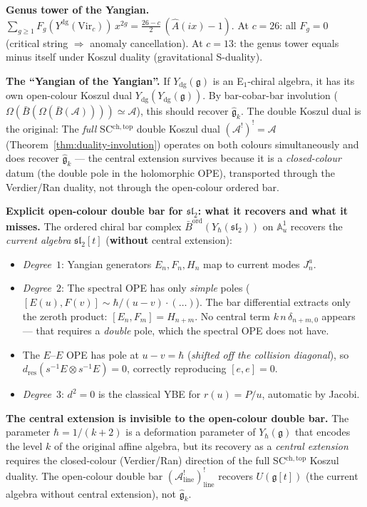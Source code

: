 \documentclass[11pt]{article}
\newcommand{\cA}{\mathcal{A}}
\newcommand{\fg}{\mathfrak{g}}
\begin{document}
\medskip\noindent\textbf{Genus tower of the Yangian.}\enspace
$\sum_{g \ge 1} F_g(Y^{\mathrm{dg}}(\mathrm{Vir}_c))\,x^{2g}
= \frac{26-c}{2}\,(\hat{A}(ix) - 1)$.
At $c = 26$: all $F_g = 0$ (critical string $\Rightarrow$
anomaly cancellation).  At $c = 13$: the genus tower equals
minus itself under Koszul duality (gravitational S-duality).

\medskip\noindent\textbf{The ``Yangian of the Yangian''.}\enspace
If $Y_{\mathrm{dg}}(\fg)$ is an E$_1$-chiral algebra, it has its
own open-colour Koszul dual
$Y_{\mathrm{dg}}(Y_{\mathrm{dg}}(\fg))$.  By bar-cobar-bar
involution
($\Omega(\bar{B}(\Omega(\bar{B}(\cA)))) \simeq \cA$),
this should recover $\widehat{\fg}_k$.  The double Koszul
dual is the original:
The \emph{full} SC${}^{\mathrm{ch,top}}$ double Koszul dual
$(\cA^!)^! = \cA$ (Theorem~\ref{thm:duality-involution})
operates on both colours simultaneously and does recover
$\widehat{\fg}_k$ --- the central extension survives because
it is a \emph{closed-colour} datum (the double pole in
the holomorphic OPE), transported through the Verdier/Ran
duality, not through the open-colour ordered bar.

\medskip\noindent\textbf{Explicit open-colour double bar for
$\mathfrak{sl}_2$: what it recovers and what it misses.}\enspace
The ordered chiral bar complex
$\bar{B}^{\mathrm{ord}}(Y_\hbar(\mathfrak{sl}_2))$ on
$\mathbb{A}^1_u$ recovers the \emph{current algebra}
$\mathfrak{sl}_2[t]$ (\textbf{without} central extension):
\begin{itemize}[nosep]
\item \emph{Degree~$1$}: Yangian generators $E_n, F_n, H_n$
  map to current modes $J^a_n$.
\item \emph{Degree~$2$}: The spectral OPE has only
  \emph{simple} poles ($[E(u), F(v)] \sim \hbar/(u{-}v)
  \cdot (\ldots)$).  The bar differential extracts only
  the zeroth product: $[E_n, F_m] = H_{n+m}$.  No
  central term $k\,n\,\delta_{n+m,0}$ appears ---
  that requires a \emph{double} pole, which the
  spectral OPE does not have.
\item The $E$--$E$ OPE has pole at $u - v = \hbar$
  (\emph{shifted off the collision diagonal}), so
  $d_{\mathrm{res}}(s^{-1}E \otimes s^{-1}E) = 0$,
  correctly reproducing $[e,e] = 0$.
\item \emph{Degree~$3$}: $d^2 = 0$ is the classical YBE for
  $r(u) = P/u$, automatic by Jacobi.
\end{itemize}
\textbf{The central extension is invisible to the
open-colour double bar.}  The parameter
$\hbar = 1/(k{+}2)$ is a deformation parameter of
$Y_\hbar(\fg)$ that encodes the level $k$ of the
original affine algebra, but its recovery as a
\emph{central extension} requires the closed-colour
(Verdier/Ran) direction of the full
SC${}^{\mathrm{ch,top}}$ Koszul duality.  The
open-colour double bar
$(\cA^!_{\mathrm{line}})^!_{\mathrm{line}}$ recovers
$U(\fg[t])$ (the current algebra without central
extension), not $\widehat{\fg}_k$.
\end{document}
